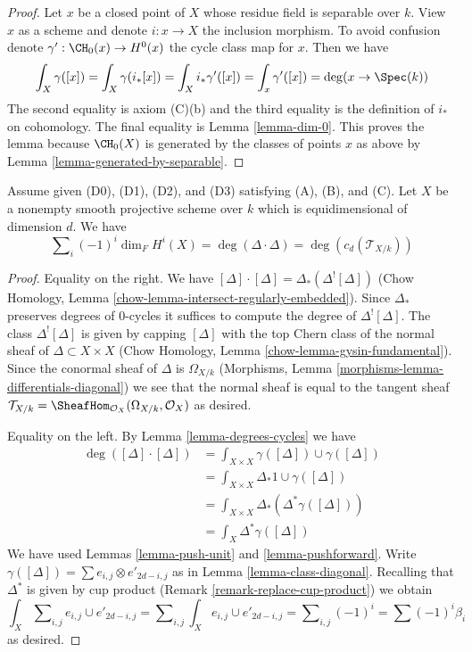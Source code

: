 \begin{proof}
Let $x$ be a closed point of $X$ whose residue field is separable
over $k$. View $x$ as a scheme and denote $i : x \to X$ the inclusion morphism.
To avoid confusion denote $\gamma' : \CH_0(x) \to H^0(x)$ the cycle class map
for $x$. Then we have
$$
\int_X \gamma([x]) = \int_X \gamma(i_*[x]) =
\int_X i_*\gamma'([x]) = \int_x \gamma'([x]) = \deg(x \to \Spec(k))
$$
The second equality is axiom (C)(b) and the third equality is
the definition of $i_*$ on cohomology. The final equality is
Lemma \ref{lemma-dim-0}. This proves the lemma
because $\CH_0(X)$ is generated by the classes of points $x$ as above
by Lemma \ref{lemma-generated-by-separable}.
\end{proof}

\begin{lemma}
\label{lemma-square-diagonal}
Assume given (D0), (D1), (D2), and (D3) satisfying (A), (B), and (C).
Let $X$ be a nonempty smooth projective scheme over $k$ which is
equidimensional of dimension $d$. We have
$$
\sum\nolimits_i (-1)^i\dim_F H^i(X) =
\deg(\Delta \cdot \Delta) = \deg(c_d(\mathcal{T}_{X/k}))
$$
\end{lemma}

\begin{proof}
Equality on the right. We have
$[\Delta] \cdot [\Delta] = \Delta_*(\Delta^![\Delta])$
(Chow Homology, Lemma \ref{chow-lemma-intersect-regularly-embedded}).
Since $\Delta_*$ preserves degrees of $0$-cycles it suffices to compute
the degree of $\Delta^![\Delta]$. The class $\Delta^![\Delta]$ is given
by capping $[\Delta]$ with
the top Chern class of the normal sheaf of $\Delta \subset X \times X$
(Chow Homology, Lemma \ref{chow-lemma-gysin-fundamental}).
Since the conormal sheaf of $\Delta$ is $\Omega_{X/k}$
(Morphisms, Lemma \ref{morphisms-lemma-differentials-diagonal})
we see that the normal sheaf is equal to the tangent sheaf
$\mathcal{T}_{X/k} = \SheafHom_{\mathcal{O}_X}(\Omega_{X/k}, \mathcal{O}_X)$
as desired.

\medskip\noindent
Equality on the left. By Lemma \ref{lemma-degrees-cycles} we have
\begin{align*}
\deg([\Delta] \cdot [\Delta])
& =
\int_{X \times X} \gamma([\Delta]) \cup \gamma([\Delta]) \\
& =
\int_{X \times X} \Delta_*1 \cup \gamma([\Delta]) \\
& =
\int_{X \times X} \Delta_*(\Delta^*\gamma([\Delta])) \\
& =
\int_X \Delta^*\gamma([\Delta])
\end{align*}
We have used Lemmas \ref{lemma-push-unit} and
\ref{lemma-pushforward}.
Write $\gamma([\Delta]) = \sum  e_{i, j} \otimes e'_{2d - i , j}$
as in Lemma \ref{lemma-class-diagonal}.
Recalling that $\Delta^*$ is given by cup product
(Remark \ref{remark-replace-cup-product}) we obtain
$$
\int_X \sum\nolimits_{i, j} e_{i, j} \cup e'_{2d - i, j} =
\sum\nolimits_{i, j} \int_X e_{i, j} \cup e'_{2d - i, j} =
\sum\nolimits_{i, j} (-1)^i = \sum (-1)^i\beta_i
$$
as desired.
\end{proof}

